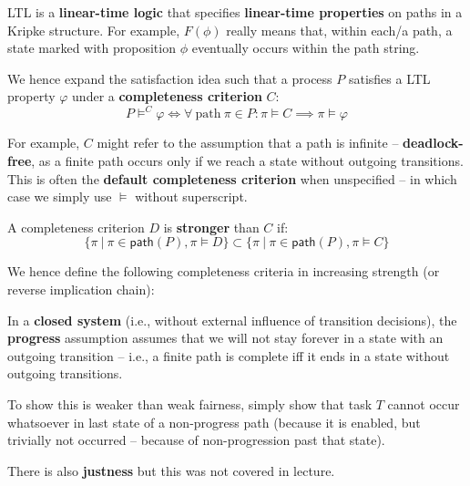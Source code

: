 \documentclass[99-notes-packed.tex]{subfiles}
\begin{document}
\begin{background}
    LTL is a \textbf{linear-time logic} that specifies \textbf{linear-time properties} on paths in a Kripke structure. For example, $F(\phi)$ really means that, within each/a path, a state marked with proposition $\phi$ eventually occurs within the path string. 

    We hence expand the satisfaction idea such that a process $P$ satisfies a LTL property $\varphi$ under a \textbf{completeness criterion} $C$: 
    \begin{equation*}
        P \models^{C} \varphi \iff \forall\ \mathrm{path}\ \pi \in P: \pi \models C \implies \pi \models \varphi
    \end{equation*}

    For example, $C$ might refer to the assumption that a path is infinite -- \textbf{deadlock-free}, as a finite path occurs only if we reach a state without outgoing transitions. This is often the \textbf{default completeness criterion} when unspecified -- in which case we simply use $\models$ without superscript. 

    A completeness criterion $D$ is \textbf{stronger} than $C$ if: 
    \begin{equation*}
        \{\pi\ |\ \pi \in \mathsf{path}(P), \pi \models D\} \subset \{\pi\ |\ \pi \in \mathsf{path}(P), \pi \models C\}
    \end{equation*}
\end{background}

We hence define the following completeness criteria in increasing strength (or reverse implication chain): 

\begin{definition}[Progress]
    In a \textbf{closed system} (i.e., without external influence of transition decisions), the \textbf{progress} assumption assumes that we will not stay forever in a state with an outgoing transition -- i.e., a finite path is complete iff it ends in a state without outgoing transitions.

    To show this is weaker than weak fairness, simply show that task $T$ cannot occur whatsoever in last state of a non-progress path (because it is enabled, but trivially not occurred -- because of non-progression past that state). 
\end{definition}

There is also \textbf{justness} but this was not covered in lecture.
\end{document}
